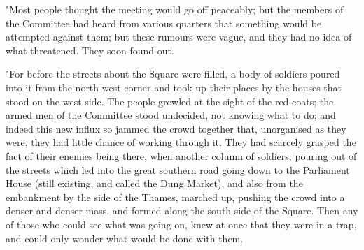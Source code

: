 "Most people thought the meeting would go off peaceably; but the members
of the Committee had heard from various quarters that something would be
attempted against them; but these rumours were vague, and they had no
idea of what threatened. They soon found out.

"For before the streets about the Square were filled, a body of soldiers
poured into it from the north-west corner and took up their places by
the houses that stood on the west side. The people growled at the sight
of the red-coats; the armed men of the Committee stood undecided, not
knowing what to do; and indeed this new influx so jammed the crowd
together that, unorganised as they were, they had little chance of
working through it. They had scarcely grasped the fact of their enemies
being there, when another column of soldiers, pouring out of the streets
which led into the great southern road going down to the Parliament
House (still existing, and called the Dung Market), and also from the
embankment by the side of the Thames, marched up, pushing the crowd into
a denser and denser mass, and formed along the south side of the Square.
Then any of those who could see what was going on, knew at once that
they were in a trap, and could only wonder what would be done with them.

